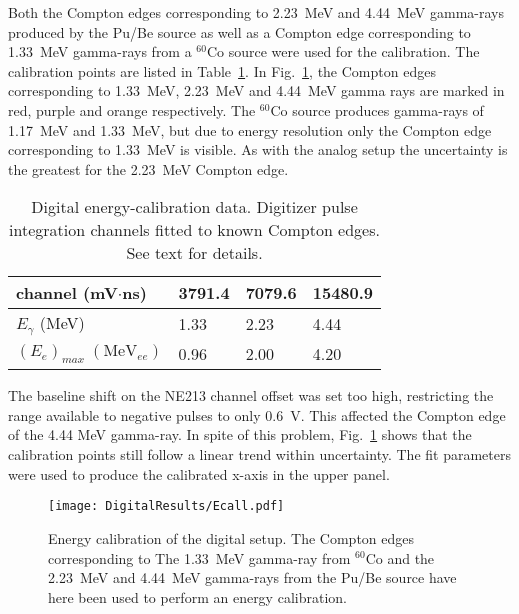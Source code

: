 \documentclass[main.tex]{subfiles}
\begin{document}
Both the Compton edges corresponding to \SI{2.23}{\MeV} and \SI{4.44}{\MeV} gamma-rays produced by the Pu/Be source as well as a Compton edge corresponding to \SI{1.33}{MeV} gamma-rays from a $^{60}$Co source were used for the calibration. The calibration points are listed in Table~\ref{tab:knox_d}. In Fig.~\ref{fig:D_QDC}, the Compton edges corresponding to \SI{1.33}{\MeV}, \SI{2.23}{\MeV} and \SI{4.44}{\MeV} gamma rays are marked in red, purple and orange respectively. The $^{60}$Co source produces gamma-rays of \SI{1.17}{\MeV} and \SI{1.33}{\MeV}, but due to energy resolution only the Compton edge corresponding to \SI{1.33}{MeV} is visible.  As with the analog setup the uncertainty is the greatest for the \SI{2.23}{\MeV} Compton edge.

\begin{table}[hb]
	\center
	\begin{tabular}{|l|l|l|l|}
	\hline
	channel (mV$\cdot$ns)            & 3791.4 & 7079.6  & 15480.9  \\
	\hline
	$E_\gamma$ (MeV)          & 1.33    & 2.23  & 4.44 \\
	\hline
	$(E_{e})_{max}\; (\textrm{MeV}_{ee})$ & 0.96    & 2.00  & 4.20 \\
	\hline
	\end{tabular}
   	\captionsetup{width=0.435\linewidth}
	\caption[Digital energy-calibration data.]{Digital energy-calibration data. Digitizer pulse integration channels fitted to known Compton edges. See text for details.}
	\label{tab:knox_d}
\end{table}

The baseline shift on the NE213 channel offset was set too high, restricting the range available to negative pulses to only \SI{0.6}{V}. This affected the Compton edge of the 4.44 \si{\MeV} gamma-ray. In spite of this problem, Fig.~\ref{fig:D_QDC} shows that the calibration points still follow a linear trend within uncertainty. The fit parameters were used to produce the calibrated x-axis in the upper panel.

\begin{figure}[ht]
    \centering
        \texttt{[image: DigitalResults/Ecall.pdf]}
        \caption[Energy calibration of the digital setup.]{Energy calibration of the digital setup. The Compton edges corresponding to The \SI{1.33}{\MeV} gamma-ray from $^{60}$Co and the \SI{2.23}{\MeV} and \SI{4.44}{\MeV} gamma-rays from the Pu/Be source have here been used to perform an energy calibration.}
    \label{fig:D_QDC}
\end{figure}
\end{document}

